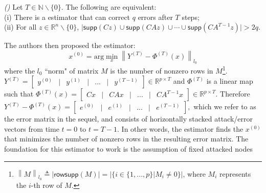 \documentclass[../../thesis.tex]{subfiles}
\newcommand{\norm}[1]{\left\lVert#1\right\rVert}
\begin{document}
\begin{proposition}  \emph{(\hspace{1sp}\cite{Fawzi2014})}  \label{prop:Fawzi} 
Let $T \in \mathbb{N}  \backslash \{ 0\}$. The following are equivalent:\\
(i) There is a estimator that can correct $q$ errors after $T$ steps;\\
(ii) For all $z\in \mathbb{R}^n \backslash \{0\}$, $\lvert \textsf{supp}(Cz) \cup \textsf{supp}(CAz) \cup \cdots \cup \textsf{supp}(CA^{T-1} z) \rvert > 2q$.
\end{proposition}
\noindent The authors then proposed the estimator:
\begin{equation}
x^{(0)} = \text{arg} \min_{x} \norm { Y^{(T)} - \Phi ^{(T)} (x) }_{l_0} 
\label{eq:opt_decoder}
\end{equation}
where the $l_0$ ``norm" of matrix $M$ is the number of nonzero rows in $M$\footnote{$\norm{M} _{l_0} \triangleq \lvert \textsf{rowsupp} (M) \rvert = \lvert \{ i \in \{ 1, ... , p\} | M_i \neq 0 \}  \rvert$, where $M_i$ represents the $i$-th row of $M$.}. $Y^{(T)} = \begin{bmatrix} y^{(0)} & \lvert & y^{(1)} & \lvert  & ... & \lvert & y^{(T-1)} \end{bmatrix} \in \mathbb{R}^{p\times T}$ and $\Phi^{(T)}$ is a linear map such that $\Phi ^{(T)} (x) = \begin{bmatrix} Cx  & \lvert & CAx  & \lvert &  ... &  \lvert & CA^{T-1} x \end{bmatrix} \in \mathbb{R}^{p\times T}$. Therefore
$Y^{(T)} - \Phi ^{(T)} (x) =  \begin{bmatrix} e^{(0)}  & \lvert & e^{(1)} & \lvert &  ... &  \lvert & e^{(T-1)} \end{bmatrix},$
which we refer to as the error matrix in the sequel, and consists of horizontally stacked attack/error vectors from time $t=0$ to $t=T-1$.
In other words, the estimator finds the $x^{(0)}$ that minimizes the number of nonzero rows in the resulting error matrix. The foundation for this estimator to work is the assumption of fixed attacked nodes
\end{document}
